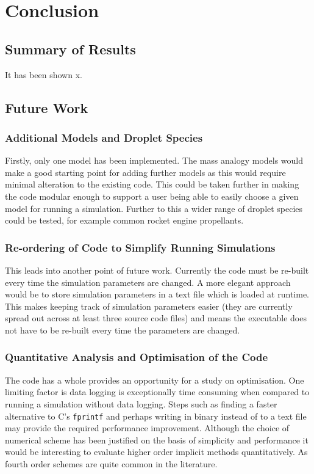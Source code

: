 \documentclass[../Interim_Report_Master]{subfiles}
\begin{document}
\hypertarget{con}{\section{Conclusion}\label{con}}
\subsection{Summary of Results}
It has been shown x.

\subsection{Future Work}
\subsubsection{Additional Models and Droplet Species}
Firstly, only one model has been implemented. The mass analogy models would make a good starting point for adding further models as this would require minimal alteration to the existing code. This could be taken further in making the code modular enough to support a user being able to easily choose a given model for running a simulation. Further to this a wider range of droplet species could be tested, for example common rocket engine propellants. 

\subsubsection{Re-ordering of Code to Simplify Running Simulations}
This leads into another point of future work. Currently the code must be re-built every time the simulation parameters are changed. A more elegant approach would be to store simulation parameters in a text file which is loaded at runtime. This makes keeping track of simulation parameters easier (they are currently spread out across at least three source code files) and means the executable does not have to be re-built every time the parameters are changed.

\subsubsection{Quantitative Analysis and Optimisation of the Code}
The code has a whole provides an opportunity for a study on optimisation. One limiting factor is data logging is exceptionally time consuming when compared to running a simulation without data logging. Steps such as finding a faster alternative to C's \lstinline[language=c, columns=fixed]|fprintf| and perhaps writing in binary instead of to a text file may provide the required performance improvement. Although the choice of numerical scheme has been justified on the basis of simplicity and performance it would be interesting to evaluate higher order implicit methods quantitatively. As fourth order schemes are quite common in the literature. 
\end{document}
